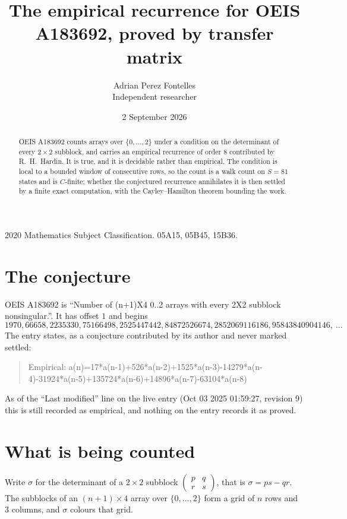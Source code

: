 \documentclass[11pt,a4paper]{article}
\title{The empirical recurrence for OEIS A183692, proved by transfer matrix}
\author{Adrian Perez Fontelles\\ \small Independent researcher}
\date{2 September 2026}
\theoremstyle{plain}
\theoremstyle{definition}
\begin{document}
\maketitle

\begin{abstract}
OEIS A183692 counts arrays over $\{0,\dots,2\}$ under a condition on the determinant of every
$2\times2$ subblock, and carries an empirical recurrence of order $8$ contributed by
R.~H.~Hardin. It is true, and it is decidable rather than empirical. The condition is local to
a bounded window of consecutive rows, so the count is a walk count on $S=81$ states and is
$C$-finite; whether the conjectured recurrence annihilates it is then settled by a finite exact
computation, with the Cayley--Hamilton theorem bounding the work.
\end{abstract}

\noindent\small 2020 Mathematics Subject Classification. 05A15, 05B45, 15B36.\normalsize

\section{The conjecture}

OEIS A183692 is ``Number of (n+1)X4 0..2 arrays with every 2X2 subblock nonsingular.''. It has offset $1$ and begins
\[
1970, 66658, 2235330, 75166498, 2525447442, 84872526674, 2852069116186, 95843840904146,\ \dots
\]
The entry states, as a conjecture contributed by its author and never marked settled:
\begin{quote}
Empirical: a(n)=17*a(n-1)+526*a(n-2)+1525*a(n-3)-14279*a(n-4)-31924*a(n-5)+135724*a(n-6)+14896*a(n-7)-63104*a(n-8)
\end{quote}
As of the ``Last modified'' line on the live entry (Oct 03 2025 01:59:27, revision 9) this is still
recorded as empirical, and nothing on the entry records it as proved.

\section{What is being counted}

Write $\sigma$ for the determinant of a $2\times2$ subblock
$\begin{pmatrix}p&q\\r&s\end{pmatrix}$, that is $\sigma=ps-qr$. The subblocks of an
$(n+1)\times4$ array over $\{0,\dots,2\}$ form a grid of $n$ rows and $3$
columns, and $\sigma$ colours that grid.
\end{document}
